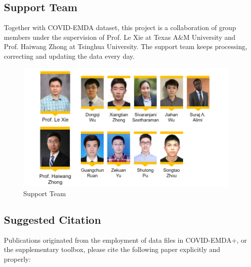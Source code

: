 \documentclass[10pt]{article}
\numberwithin{equation}{section}
\numberwithin{table}{section}
\numberwithin{figure}{section}
\begin{document}
\newpage
\subsection{Support Team}

Together with COVID-EMDA dataset, this project is a collaboration of group members under the supervision of Prof. Le Xie at Texas A\&M University and Prof. Haiwang Zhong at Tsinghua University. The support team keeps processing, correcting and updating the data every day.

\begin{figure}[!ht]
    \centering
    \includegraphics[width=.8\textwidth]{figures/contributor-extend-20210408.png}
    \caption{Support Team}
\end{figure}


\clearpage
\subsection{Suggested Citation}
Publications originated from the employment of data files in COVID-EMDA+, or the supplementary toolbox, please cite the following paper explicitly and properly: 
\end{document}
